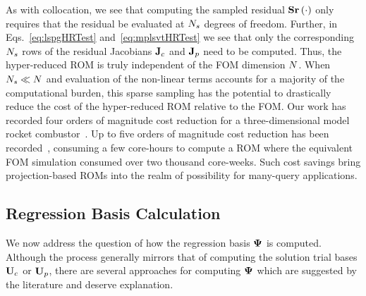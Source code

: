 As with collocation, we see that computing the sampled residual $\mathbf{S} \mathbf{r}\left(\cdot\right)$ only requires that the residual be evaluated at $N_s$ degrees of freedom. Further, in Eqs.~\ref{eq:lspgHRTest} and~\ref{eq:mplsvtHRTest} we see that only the corresponding $N_s$ rows of the residual Jacobians $\mathbf{J}_{c} $ and $\mathbf{J}_{p}$ need to be computed. Thus, the hyper-reduced ROM is truly independent of the FOM dimension $N$. When $N_s \ll N$ and evaluation of the non-linear terms accounts for a majority of the computational burden, this sparse sampling has the potential to drastically reduce the cost of the hyper-reduced ROM relative to the FOM. Our work has recorded four orders of magnitude cost reduction for a three-dimensional model rocket combustor~\cite{Wentland2021}. Up to five orders of magnitude cost reduction has been recorded~\cite{Grimberg2021}, consuming a few core-hours to compute a ROM where the equivalent FOM simulation consumed over two thousand core-weeks. Such cost savings bring projection-based ROMs into the realm of possibility for many-query applications.

\subsection{Regression Basis Calculation}\label{subsec:regBasis}
%
We now address the question of how the regression basis $\deimBasis$ is computed. Although the process generally mirrors that of computing the solution trial bases $\consTrial$ or $\primTrial$, there are several approaches for computing $\deimBasis$ which are suggested by the literature and deserve explanation.

